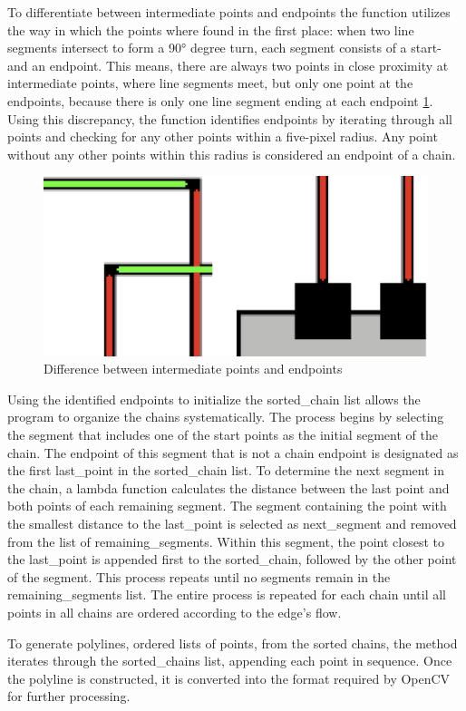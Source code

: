 To differentiate between intermediate points and endpoints the function utilizes the way in which the points where found in the first place: when two line segments intersect to form a 90° degree turn, each segment consists of a start- and an endpoint. This means, there are always two points in close proximity at intermediate points, where line segments meet, but only one point at the endpoints, because there is only one line segment ending at each endpoint \ref{fig_point_zoom}.
Using this discrepancy, the function identifies endpoints by iterating through all points and checking for any other points within a five-pixel radius. Any point without any other points within this radius is considered an endpoint of a chain.\\
\begin{figure}
    \centering
    \includegraphics[width=0.5\linewidth]{Pictures/zoomed_in_points.png}
    \caption{Difference between intermediate points and endpoints}
    \label{fig_point_zoom}
\end{figure}
Using the identified endpoints to initialize the sorted\_chain list allows the program to organize the chains systematically. The process begins by selecting the segment that includes one of the start points as the initial segment of the chain. The endpoint of this segment that is not a chain endpoint is designated as the first last\_point in the sorted\_chain list. To determine the next segment in the chain, a lambda function calculates the distance between the last point and both points of each remaining segment. The segment containing the point with the smallest distance to the last\_point is selected as next\_segment and removed from the list of remaining\_segments. Within this segment, the point closest to the last\_point is appended first to the sorted\_chain, followed by the other point of the segment. This process repeats until no segments remain in the remaining\_segments list. The entire process is repeated for each chain until all points in all chains are ordered according to the edge's flow.

To generate polylines, ordered lists of points, from the sorted chains, the method iterates through the sorted\_chains list, appending each point in sequence. Once the polyline is constructed, it is converted into the format required by OpenCV for further processing.
